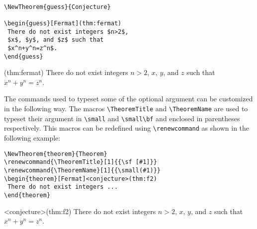\noindent\begin{minipage}{\Width}
\small\begin{verbatim}

\NewTheorem{guess}{Conjecture}

\begin{guess}[Fermat](thm:fermat)
 There do not exist integers $n>2$,
 $x$, $y$, and $z$ such that
 $x^n+y^n=z^n$.
\end{guess}
\end{verbatim}
\end{minipage}
\hfill
\begin{minipage}{\Width}

\begin{guess}[Fermat](thm:fermat)
 There do not exist integers $n>2$,
 $x$, $y$, and $z$ such that
 $x^n+y^n=z^n$.
\end{guess}
\end{minipage}
\medskip

The commands used to typeset some of the optional argument can be customized
in the following way. The macros \verb|\TheoremTitle| and \verb|\TheoremName|
are used to typeset their argument in \verb|\small| and \verb|\small\bf| and
enclosed in parentheses respectively. This macros can be redefined using
\verb|\renewcommand| as shown in the following example:
\medskip

\noindent\begin{minipage}{\Width}
\footnotesize\begin{verbatim}
\NewTheorem{theorem}{Theorem}
\renewcommand{\TheoremTitle}[1]{{\sf [#1]}}
\renewcommand{\TheoremName}[1]{{\small(#1)}}
\begin{theorem}[Fermat]<conjecture>(thm:f2)
 There do not exist integers ...
\end{theorem}
\end{verbatim}
\end{minipage}
\hfill
\begin{minipage}{\Width}
\renewcommand{\TheoremTitle}[1]{{\sf #1}}
\renewcommand{\TheoremName}[1]{{\small(#1)}}
\begin{theorem}[Fermat]<conjecture>(thm:f2)
 There do not exist integers $n>2$,
 $x$, $y$, and $z$ such that
 $x^n+y^n=z^n$.
\end{theorem}
\end{minipage}





\newcommand{\ENTRY}[1]{{#1 \Nat}& {#1 \Int}& {#1 \Rat}&{#1 \Real}& {#1 \Complex}}

